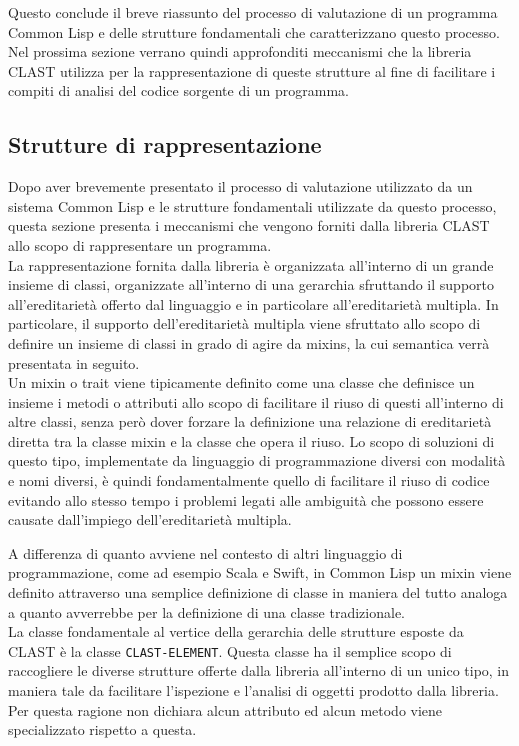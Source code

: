 Questo conclude il breve riassunto del processo di valutazione di un programma Common Lisp e delle strutture fondamentali che caratterizzano questo processo. Nel prossima sezione verrano quindi approfonditi meccanismi che la libreria CLAST utilizza per la rappresentazione di queste strutture al fine di facilitare i compiti di analisi del codice sorgente di un programma.

\subsection{Strutture di rappresentazione}

Dopo aver brevemente presentato il processo di valutazione utilizzato da un sistema Common Lisp e le strutture fondamentali utilizzate da questo processo, questa sezione presenta i meccanismi che vengono forniti dalla libreria CLAST allo scopo di rappresentare un programma.\\

La rappresentazione fornita dalla libreria è organizzata all’interno di un grande insieme di classi, organizzate all’interno di una gerarchia sfruttando il supporto all’ereditarietà offerto dal linguaggio e in particolare all’ereditarietà multipla. In particolare, il supporto dell’ereditarietà multipla viene sfruttato allo scopo di definire un insieme di classi in grado di agire da mixins, la cui semantica verrà presentata in seguito.\\

Un mixin o trait viene tipicamente definito come una classe che definisce un insieme i metodi o attributi allo scopo di facilitare il riuso di questi all’interno di altre classi, senza però dover forzare la definizione una relazione di ereditarietà diretta tra la classe mixin e la classe che opera il riuso. Lo scopo di soluzioni di questo tipo, implementate da linguaggio di programmazione diversi con modalità e nomi diversi, è quindi fondamentalmente quello di facilitare il riuso di codice evitando allo stesso tempo i problemi legati alle ambiguità che possono essere causate dall’impiego dell’ereditarietà multipla.

A differenza di quanto avviene nel contesto di altri linguaggio di programmazione, come ad esempio Scala e Swift, in Common Lisp un mixin viene definito attraverso una semplice definizione di classe in maniera del tutto analoga a quanto avverrebbe per la definizione di una classe tradizionale.\\

La classe fondamentale al vertice della gerarchia delle strutture esposte da CLAST è la classe \texttt{CLAST-ELEMENT}. Questa classe ha il semplice scopo di raccogliere le diverse strutture offerte dalla libreria all'interno di un unico tipo, in maniera tale da facilitare l’ispezione e l’analisi di oggetti prodotto dalla libreria. Per questa ragione non dichiara alcun attributo ed alcun metodo viene specializzato rispetto a questa.\\

